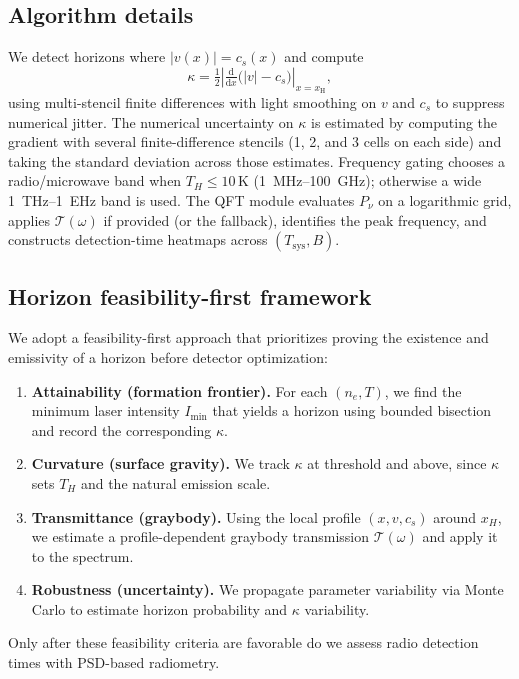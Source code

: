 \documentclass[11pt]{article}
\begin{document}
\subsection{Algorithm details}
We detect horizons where $|v(x)| = c_s(x)$ and compute
\begin{equation}
  \kappa = \tfrac{1}{2} \left|\tfrac{\mathrm{d}}{\mathrm{d}x}\big(|v| - c_s\big)\right|_{x=x_\mathrm{H}},
\end{equation}
using multi-stencil finite differences with light smoothing on $v$ and $c_s$ to suppress numerical jitter. The numerical uncertainty on $\kappa$ is estimated by computing the gradient with several finite-difference stencils (1, 2, and 3 cells on each side) and taking the standard deviation across those estimates.
Frequency gating chooses a radio/microwave band when $T_H\!\le\!10\,$K (\SI{1}{MHz}--\SI{100}{GHz}); otherwise a wide \SI{1}{THz}--\SI{1}{EHz} band is used. The QFT module evaluates $P_{\nu}$ on a logarithmic grid, applies $\mathcal{T}(\omega)$ if provided (or the fallback), identifies the peak frequency, and constructs detection-time heatmaps across $(T_{\mathrm{sys}}, B)$.

\subsection{Horizon feasibility-first framework}
We adopt a feasibility-first approach that prioritizes proving the existence and emissivity of a horizon before detector optimization:
\begin{enumerate}
  \item \textbf{Attainability (formation frontier).} For each $(n_e, T)$, we find the minimum laser intensity $I_{\min}$ that yields a horizon using bounded bisection and record the corresponding $\kappa$.
  \item \textbf{Curvature (surface gravity).} We track $\kappa$ at threshold and above, since $\kappa$ sets $T_H$ and the natural emission scale.
  \item \textbf{Transmittance (graybody).} Using the local profile $(x, v, c_s)$ around $x_H$, we estimate a profile-dependent graybody transmission $\mathcal{T}(\omega)$ and apply it to the spectrum.
  \item \textbf{Robustness (uncertainty).} We propagate parameter variability via Monte Carlo to estimate horizon probability and $\kappa$ variability.
\end{enumerate}
Only after these feasibility criteria are favorable do we assess radio detection times with PSD-based radiometry.
\end{document}
